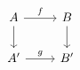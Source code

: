 \documentclass[12pt]{standalone}
\begin{document}
        $$

\begin{tikzcd}
    A \ar[r,"f"] \ar[d] & B \ar[d] \\ 
    A^\prime \ar[r,"g"] & B^\prime
\end{tikzcd}
        $$
        
\end{document}
